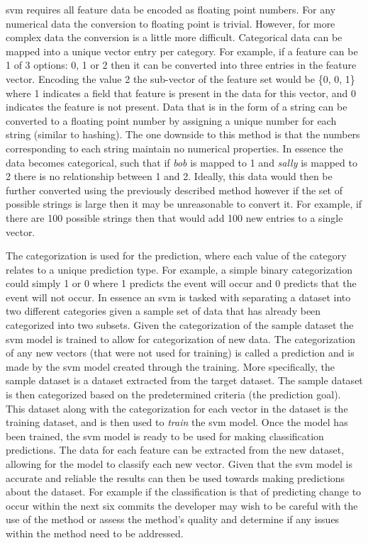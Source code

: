 \gls{svm} requires all feature data be encoded as floating point numbers. For any numerical data the conversion to floating point is trivial. However, for more complex data the conversion is a little more difficult. Categorical data can be mapped into a unique vector entry per category. For example, if a feature can be 1 of 3 options: 0, 1 or 2 then it can be converted into three entries in the feature vector. Encoding the value 2 the sub-vector of the feature set would be \{0, 0, 1\} where 1 indicates a field that feature is present in the data for this vector, and 0 indicates the feature is not present. Data that is in the form of a string can be converted to a floating point number by assigning a unique number for each string (similar to hashing). The one downside to this method is that the numbers corresponding to each string maintain no numerical properties. In essence the data becomes categorical, such that if \textit{bob} is mapped to 1 and \textit{sally} is mapped to 2 there is no relationship between 1 and 2. Ideally, this data would then be further converted using the previously described method however if the set of possible strings is large then it may be unreasonable to convert it. For example, if there are 100 possible strings then that would add 100 new entries to a single vector.


The categorization is used for the prediction, where each value of the category relates to a unique prediction type. For example, a simple binary categorization could simply 1 or 0 where 1 predicts the event will occur and 0 predicts that the event will not occur. In essence an \gls{svm} is tasked with separating a dataset into two different categories given a sample set of data that has already been categorized into two subsets. Given the categorization of the sample dataset the \gls{svm} model is trained to allow for categorization of new data. The categorization of any new vectors (that were not used for training) is called a prediction and is made by the \gls{svm} model created through the training. More specifically, the sample dataset is a dataset extracted from the target dataset. The sample dataset is then categorized based on the predetermined criteria (the prediction goal). This dataset along with the categorization for each vector in the dataset is the training dataset, and is then used to \textit{train} the \gls{svm} model. Once the model has been trained, the \gls{svm} model is ready to be used for making classification predictions. The data for each feature can be extracted from the new dataset, allowing for the model to classify each new vector. Given that the \gls{svm} model is accurate and reliable the results can then be used towards making predictions about the dataset. For example if the classification is that of predicting change to occur within the next six commits the developer may wish to be careful with the use of the method or assess the method's quality and determine if any issues within the method need to be addressed.

